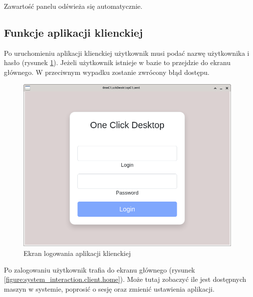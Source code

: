 \documentclass[../opis-rozwiazania.tex]{subfiles}
\begin{document}
Zawartość panelu odświeża się automatycznie.

\newpage
\subsection{Funkcje aplikacji klienckiej}

Po uruchomieniu aplikacji klienckiej użytkownik musi podać nazwę użytkownika i hasło (rysunek \ref{figure:system_interaction.client.login}).
Jeżeli użytkownik istnieje w bazie to przejdzie do ekranu głównego.
W przeciwnym wypadku zostanie zwrócony błąd dostępu.

\begin{figure}[h!]
  \centering
  \includegraphics[width=\textwidth]{resources/client_login.png}
  \caption{Ekran logowania aplikacji klienckiej}
  \label{figure:system_interaction.client.login}
\end{figure}

Po zalogowaniu użytkownik trafia do ekranu głównego (rysunek \ref{figure:system_interaction.client.home}).
Może tutaj zobaczyć ile jest dostępnych maszyn w systemie, poprosić o sesję oraz zmienić ustawienia aplikacji.
\end{document}
